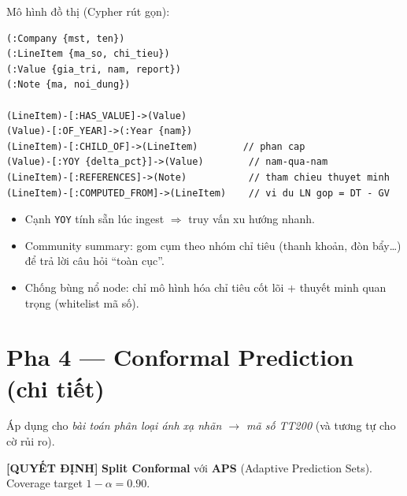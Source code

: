 \documentclass[11pt,a4paper]{article}
\newcommand{\dec}[1]{\textbf{\color{fsgreen!60!black}[QUYẾT ĐỊNH]} #1}
\begin{document}
Mô hình đồ thị (Cypher rút gọn):
\begin{Verbatim}
(:Company {mst, ten})
(:LineItem {ma_so, chi_tieu})
(:Value {gia_tri, nam, report})
(:Note {ma, noi_dung})

(LineItem)-[:HAS_VALUE]->(Value)
(Value)-[:OF_YEAR]->(:Year {nam})
(LineItem)-[:CHILD_OF]->(LineItem)        // phan cap
(Value)-[:YOY {delta_pct}]->(Value)        // nam-qua-nam
(LineItem)-[:REFERENCES]->(Note)           // tham chieu thuyet minh
(LineItem)-[:COMPUTED_FROM]->(LineItem)    // vi du LN gop = DT - GV
\end{Verbatim}
\begin{itemize}
  \item Cạnh \texttt{YOY} tính sẵn lúc ingest $\Rightarrow$ truy vấn xu hướng nhanh.
  \item Community summary: gom cụm theo nhóm chỉ tiêu (thanh khoản, đòn bẩy\dots) để trả lời câu hỏi ``toàn cục''.
  \item Chống bùng nổ node: chỉ mô hình hóa chỉ tiêu cốt lõi + thuyết minh quan trọng (whitelist mã số).
\end{itemize}

\section{Pha 4 --- Conformal Prediction (chi tiết)}

Áp dụng cho \emph{bài toán phân loại ánh xạ nhãn $\rightarrow$ mã số TT200} (và tương tự cho cờ rủi ro).

\begin{quyetdinh}
\dec{} \textbf{Split Conformal} với \textbf{APS} (Adaptive Prediction Sets). Coverage target $1-\alpha = 0.90$.
\end{quyetdinh}
\end{document}
